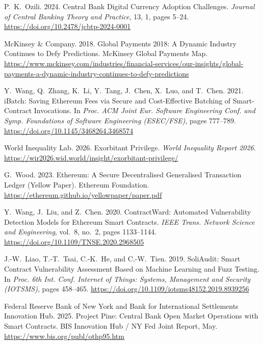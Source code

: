 \documentclass[12pt,a4paper]{report}
\begin{document}
{\begin{enumerate}[label={[\arabic*]}]
\item P.~K.~Ozili. 2024. Central Bank Digital Currency Adoption Challenges. \emph{Journal of Central Banking Theory and Practice}, 13, 1, pages 5--24. \url{https://doi.org/10.2478/jcbtp-2024-0001}


\item McKinsey \& Company. 2018. Global Payments 2018: A Dynamic Industry Continues to Defy Predictions. McKinsey Global Payments Map. \url{https://www.mckinsey.com/industries/financial-services/our-insights/global-payments-a-dynamic-industry-continues-to-defy-predictions}


\item Y.~Wang, Q.~Zhang, K.~Li, Y.~Tang, J.~Chen, X.~Luo, and T.~Chen. 2021. iBatch: Saving Ethereum Fees via Secure and Cost-Effective Batching of Smart-Contract Invocations. In \emph{Proc. ACM Joint Eur. Software Engineering Conf. and Symp. Foundations of Software Engineering (ESEC/FSE)}, pages 777--789. \url{https://doi.org/10.1145/3468264.3468574}


\item World Inequality Lab. 2026. Exorbitant Privilege. \emph{World Inequality Report 2026}. \url{https://wir2026.wid.world/insight/exorbitant-privilege/}


\item G.~Wood. 2023. Ethereum: A Secure Decentralised Generalised Transaction Ledger (Yellow Paper). Ethereum Foundation. \url{https://ethereum.github.io/yellowpaper/paper.pdf}


\item Y.~Wang, J.~Liu, and Z.~Chen. 2020. ContractWard: Automated Vulnerability Detection Models for Ethereum Smart Contracts. \emph{IEEE Trans. Network Science and Engineering}, vol.~8, no.~2, pages 1133--1144. \url{https://doi.org/10.1109/TNSE.2020.2968505}


\item J.-W.~Liao, T.-T.~Tsai, C.-K.~He, and C.-W.~Tien. 2019. SoliAudit: Smart Contract Vulnerability Assessment Based on Machine Learning and Fuzz Testing. In \emph{Proc. 6th Int. Conf. Internet of Things: Systems, Management and Security (IOTSMS)}, pages 458--465. \url{https://doi.org/10.1109/iotsms48152.2019.8939256}


\item Federal Reserve Bank of New York and Bank for International Settlements Innovation Hub. 2025. Project Pine: Central Bank Open Market Operations with Smart Contracts. BIS Innovation Hub / NY Fed Joint Report, May. \url{https://www.bis.org/publ/othp95.htm}

\end{enumerate}
}
\end{document}
